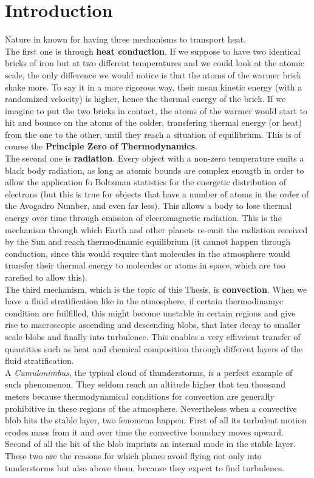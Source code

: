 \documentclass[11pt]{article}
\numberwithin{equation}{section}
\begin{document}
\section{Introduction}
Nature in known for having three mechanisms to transport heat.  \\
The first one is through \textbf{heat conduction}. If we suppose to have two identical bricks of iron but at two different temperatures and we could look at the atomic scale, the only difference we would notice is that the atoms of the warmer brick shake more. To say it in a more rigorous way, their mean kinetic energy (with a randomized velocity) is higher, hence the thermal energy of the brick. If we imagine to put the two bricks in contact, the atoms of the warmer would start to hit and bounce on the atoms of the colder, transfering thermal energy (or heat) from the one to the other, until they reach a situation of equilibrium. This is of course the \textbf{Principle Zero of Thermodynamics}. \\
The second one is \textbf{radiation}. Every object with a non-zero temperature emits a black body radiation, as long as atomic bounds are complex enougth in order to allow the application fo Boltzman statistics for the energetic distribution of electrons (but this is true for objects that have a number of atoms in the order of the Avogadro Number, and even far less). This allows a body to lose thermal energy over time through emission of elecromagnetic radiation. This is the mechanism through which Earth and other planets re-emit the radiation received by the Sun and reach thermodinamic equilibrium (it cannot happen through conduction, since this would require that molecules in the atmosphere would transfer their thermal energy to molecules or atoms in space, which are too rarefied to allow this). \\
The third mechanism, which is the topic of this Thesis, is \textbf{convection}. When we have a fluid stratification like in the atmosphere, if certain thermodinamyc condition are fuilfilled, this might become unstable in certain regions and give rise to macroscopic ascending and descending blobs, that later decay to smaller scale blobs and finally into turbulence. This enables a very effivcient transfer of quantities such as heat and chemical composition through different layers of the fluid stratification. \\
A \textit{Cumulonimbus}, the typical cloud of thunderstorms, is a perfect example of such phenomenon. They seldom reach an altitude higher that ten thousand meters because thermodynamical conditions for convection are generally prohibitive in these regions of the atmosphere. Nevertheless when a convective blob hits the stable layer, two fenomena happen. First of all its turbulent motion erodes mass from it and over time the convective boundary moves upward. Second of all the hit of the blob imprints an internal mode in the stable layer. These two are the reasons for which planes avoid flying not only into tunderstorms but also above them, because they expect to find turbulence. \\
\end{document}
